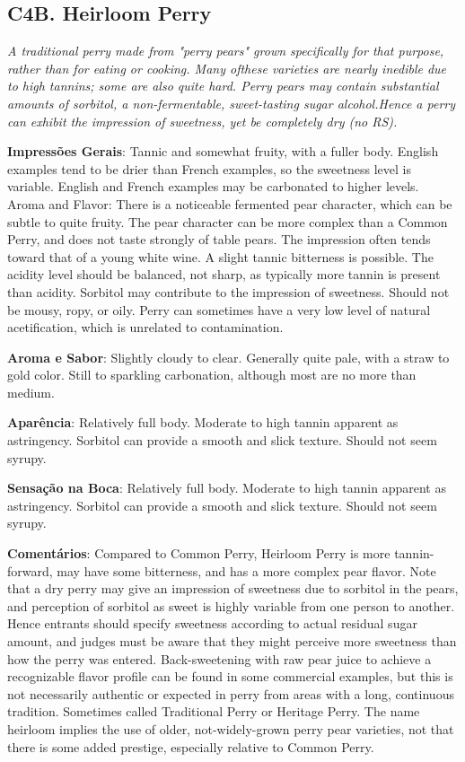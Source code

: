 \subsection*{C4B. Heirloom Perry}

\textit{A traditional perry made from "perry pears" grown specifically for that purpose, rather than for eating or cooking. Many ofthese varieties are nearly inedible due to high tannins; some are also quite hard. Perry pears may contain substantial amounts of sorbitol, a non-fermentable, sweet-tasting sugar alcohol.Hence a perry can exhibit the impression of sweetness, yet be completely dry (no RS).}

\textbf{Impressões Gerais}: Tannic and somewhat fruity, with a fuller body. English examples tend to be drier than French examples, so the sweetness level is variable. English and French examples may be carbonated to higher levels.
Aroma and Flavor: There is a noticeable fermented pear character, which can be subtle to quite fruity. The pear character can be more complex than a Common Perry, and does not taste strongly of table pears. The impression often tends toward that of a young white wine. A slight tannic bitterness is possible. The acidity level should be balanced, not sharp, as typically more tannin is present than acidity. Sorbitol may contribute to the impression of sweetness. Should not be mousy, ropy, or oily. Perry can sometimes have a very low level of natural acetification, which is unrelated to contamination.

\textbf{Aroma e Sabor}: Slightly cloudy to clear. Generally quite pale, with a straw to gold color. Still to sparkling carbonation, although most are no more than medium.

\textbf{Aparência}: Relatively full body. Moderate to high tannin apparent as astringency. Sorbitol can provide a smooth and slick texture. Should not seem syrupy.

\textbf{Sensação na Boca}: Relatively full body. Moderate to high tannin apparent as astringency. Sorbitol can provide a smooth and slick texture. Should not seem syrupy.

\textbf{Comentários}: Compared to Common Perry, Heirloom Perry is more tannin-forward, may have some bitterness, and has a more complex pear flavor. Note that a dry perry may give an impression of sweetness due to sorbitol in the pears, and perception of sorbitol as sweet is highly variable from one person to another. Hence entrants should specify sweetness according to actual residual sugar amount, and judges must be aware that they might perceive more sweetness than how the perry was entered. Back-sweetening with raw pear juice to achieve a recognizable flavor profile can be found in some commercial examples, but this is not necessarily authentic or expected in perry from areas with a long, continuous tradition. Sometimes called Traditional Perry or Heritage Perry. The name heirloom implies the use of older, not-widely-grown perry pear varieties, not that there is some added prestige, especially relative to Common Perry.

